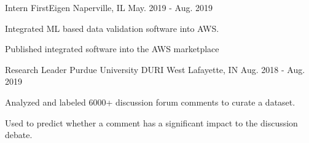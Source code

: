 \begin{cventries}
  \cventry
    {Intern} %
    {FirstEigen} %
    {Naperville, IL} %
    {May. 2019 - Aug. 2019} %
    {
      \begin{cvitems} %
        \item{Integrated ML based data validation software into AWS.}
        \item{Published integrated software into the AWS marketplace}
      \end{cvitems}
    }

  \cventry
    {Research Leader} %
    {Purdue University DURI} %
    {West Lafayette, IN} %
    {Aug. 2018 - Aug. 2019} %
    {
      \begin{cvitems} %
        \item{Analyzed and labeled 6000+ discussion forum comments to curate a dataset.}
        \item{Used to predict whether a comment has a significant impact to the discussion debate.}
      \end{cvitems}
    }
\end{cventries}
